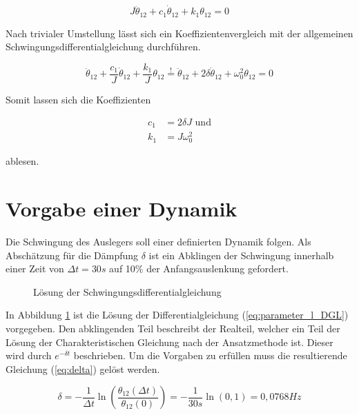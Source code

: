 \begin{equation} \label{eq:parameter_l_DGL}
J\ddot{\theta}_{12}+c_1\dot{\theta}_{12}+k_1\theta_{12}=0
\end{equation}

Nach trivialer Umstellung lässt sich ein Koeffizientenvergleich mit der allgemeinen Schwingungsdifferentialgleichung durchführen.

\begin{equation} \label{eq:parameter_koeffvergl}
\ddot{\theta}_{12}+\dfrac{c_1}{J}\dot{\theta}_{12}+\dfrac{k_1}{J}\theta_{12}\stackrel{!}{=}\ddot{\theta}_{12}+2\delta\dot{\theta}_{12}+\omega_0^2\theta_{12}=0
\end{equation}

Somit lassen sich die Koeffizienten 

\begin{equation} \label{eq:parameter_koeff}
\begin{aligned}
c_1&=2\delta J \mbox{ und}\\
k_1&=J\omega_0^2
\end{aligned}
\end{equation}

ablesen.

\section{Vorgabe einer Dynamik}

Die Schwingung des Auslegers soll einer definierten Dynamik folgen. Als Abschätzung für die Dämpfung $\delta$ ist ein Abklingen der Schwingung innerhalb einer Zeit von $\Delta t=30\si{s}$ auf 10\% der Anfangsauslenkung gefordert.

\begin{figure}[h]
	\centering
	\def\svgscale{0.5}
	
	\caption[Schwingungszeitverlauf]{Lösung der Schwingungsdifferentialgleichung}
	\label{fig:dgl_lsg}
\end{figure}

In Abbildung \ref{fig:dgl_lsg} ist die Lösung der Differentialgleichung (\ref{eq:parameter_l_DGL}) vorgegeben. Den abklingenden Teil beschreibt der Realteil, welcher ein Teil der Lösung der Charakteristischen Gleichung nach der Ansatzmethode ist. Dieser wird durch $e^{-\delta t}$ beschrieben. Um die Vorgaben zu erfüllen muss die resultierende Gleichung (\ref{eq:delta}) gelöst werden.

\begin{equation} \label{eq:delta}
\delta=-\dfrac{1}{\Delta t}\ln\left(\dfrac{\theta_{12}(\Delta t)}{\theta_{12}(0)}\right)=-\dfrac{1}{30\si{s}}\ln(0,1)=0,0768\si{Hz}
\end{equation}

